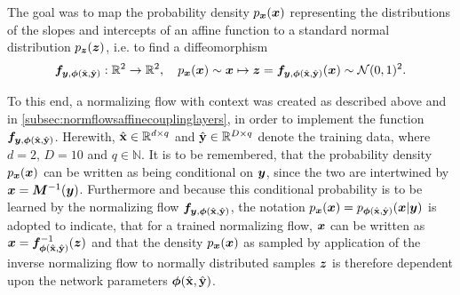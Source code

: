 \documentclass[a4paper,12pt]{report}
\begin{document}
The goal was to map the probability density $p_{\bm{x}}(\bm{x})$ representing the distributions of the slopes and intercepts of an affine function to a standard normal distribution $p_{\bm{z}}(\bm{z})$, i.e. to find a diffeomorphism
\begin{equation}
\bm{f}_{\bm{y},\bm{\phi}(\hat{\boldsymbol{\mathbf{x}}},\hat{\boldsymbol{\mathbf{y}}})}: \mathbb{R}^2\rightarrow \mathbb{R}^2, \quad p_{\bm{x}}(\bm{x}) \sim \bm{x} \mapsto \bm{z} = \bm{f}_{\bm{y},\bm{\phi}(\hat{\boldsymbol{\mathbf{x}}},\hat{\boldsymbol{\mathbf{y}}})}(\bm{x}) \sim  \mathcal{N}(0,1)^2.
\end{equation}

To this end, a normalizing flow with context was created as described above and in \cref{subsec:normflowsaffinecouplinglayers}, in order to implement the function $\bm{f}_{\bm{y},\bm{\phi}(\hat{\boldsymbol{\mathbf{x}}},\hat{\boldsymbol{\mathbf{y}}})}$. Herewith, $\hat{\boldsymbol{\mathbf{x}}} \in \mathbb{R}^{d\times q}$ and $\hat{\boldsymbol{\mathbf{y}}} \in \mathbb{R}^{D\times q}$ denote the training data, where $d=2$, $D = 10$ and $q \in \mathbb{N}$. It is to be remembered, that the probability density $p_{\bm{x}}(\bm{x})$ can be written as being conditional on $\bm{y}$, since the two are intertwined by $\bm{x} = \bm{M}^{-1}(\bm{y})$. Furthermore and because this conditional probability is to be learned by the normalizing flow $\bm{f}_{\bm{y},\bm{\phi}(\hat{\boldsymbol{\mathbf{x}}},\hat{\boldsymbol{\mathbf{y}}})}$, the notation $p_{\bm{x}}(\bm{x}) = p_{\bm{\phi}(\hat{\boldsymbol{\mathbf{x}}},\hat{\boldsymbol{\mathbf{y}}})}(\bm{x}|\bm{y})$ is adopted to indicate, that for a trained normalizing flow, $\bm{x}$ can be written as $\bm{x} = \bm{f}^{-1}_{\bm{\phi}(\hat{\boldsymbol{\mathbf{x}}},\hat{\boldsymbol{\mathbf{y}}})}(\bm{z})$ and that the density $p_{\bm{x}}(\bm{x})$ as sampled by application of the inverse normalizing flow to normally distributed samples $\bm{z}$ is therefore dependent upon the network parameters $\bm{\phi}(\hat{\boldsymbol{\mathbf{x}}},\hat{\boldsymbol{\mathbf{y}}})$.
\end{document}
